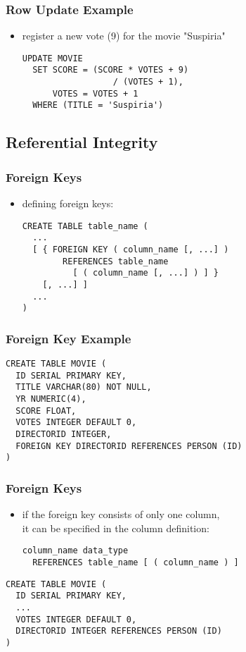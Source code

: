 \documentclass[dvipsnames]{beamer}
\theoremstyle{plain}
\begin{document}
\begin{frame}[fragile]
  \frametitle{Row Update Example}

  \begin{itemize}
    \item register a new vote (9) for the movie "Suspiria"
    \begin{lstlisting}
UPDATE MOVIE
  SET SCORE = (SCORE * VOTES + 9)
                  / (VOTES + 1),
      VOTES = VOTES + 1
  WHERE (TITLE = 'Suspiria')
    \end{lstlisting}
  \end{itemize}
\end{frame}

\subsection{Referential Integrity}

\begin{frame}[fragile]
  \frametitle{Foreign Keys}

  \begin{itemize}
    \item defining foreign keys:
    \begin{lstlisting}
CREATE TABLE table_name (
  ...
  [ { FOREIGN KEY ( column_name [, ...] )
        REFERENCES table_name
          [ ( column_name [, ...] ) ] }
    [, ...] ]
  ...
)
    \end{lstlisting}
  \end{itemize}
\end{frame}

\begin{frame}[fragile]
  \frametitle{Foreign Key Example}

  \begin{lstlisting}
CREATE TABLE MOVIE (
  ID SERIAL PRIMARY KEY,
  TITLE VARCHAR(80) NOT NULL,
  YR NUMERIC(4),
  SCORE FLOAT,
  VOTES INTEGER DEFAULT 0,
  DIRECTORID INTEGER,
  FOREIGN KEY DIRECTORID REFERENCES PERSON (ID)
)
  \end{lstlisting}
\end{frame}

\begin{frame}[fragile]
  \frametitle{Foreign Keys}

  \begin{itemize}
    \item if the foreign key consists of only one column,\\
      it can be specified in the column definition:
    \begin{lstlisting}
column_name data_type
  REFERENCES table_name [ ( column_name ) ]
    \end{lstlisting}
  \end{itemize}

  \begin{example}
    \begin{lstlisting}
CREATE TABLE MOVIE (
  ID SERIAL PRIMARY KEY,
  ...
  VOTES INTEGER DEFAULT 0,
  DIRECTORID INTEGER REFERENCES PERSON (ID)
)
    \end{lstlisting}
  \end{example}
\end{frame}
\end{document}
